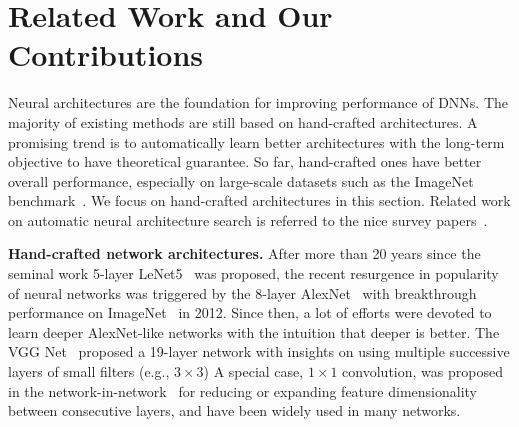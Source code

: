 \documentclass[10pt,twocolumn,letterpaper]{article}
\begin{document}
\section{Related Work and Our Contributions}
 Neural architectures are the foundation for improving performance of DNNs. 
The majority of existing methods are still based on hand-crafted architectures. A promising trend is to automatically learn better architectures with the long-term objective to have theoretical guarantee. So far, hand-crafted ones have better overall performance, especially on large-scale datasets such as the ImageNet benchmark~\cite{ImageNet}. We focus on hand-crafted architectures in this section. Related work on automatic neural architecture search is referred to the nice survey papers~\cite{NAS-survey1,NAS-survey2}.

\textbf{Hand-crafted network architectures.} 
After more than 20 years since the seminal work 5-layer LeNet5~\cite{LeCunCNN} was proposed, the recent resurgence in popularity of neural networks was triggered by the 8-layer AlexNet~\cite{AlexNet} with breakthrough performance on ImageNet~\cite{ImageNet} in 2012.
Since then, a lot of efforts were devoted to learn deeper AlexNet-like networks with the intuition that deeper is better. The VGG Net~\cite{VGG} proposed a 19-layer network with insights on using multiple successive layers of small filters (e.g., $3\times 3$) %
A special case, $1\times 1$ convolution, was proposed in the network-in-network~\cite{NetInNet} for reducing or expanding feature dimensionality between consecutive layers, and have been widely used in many networks. %
\end{document}
